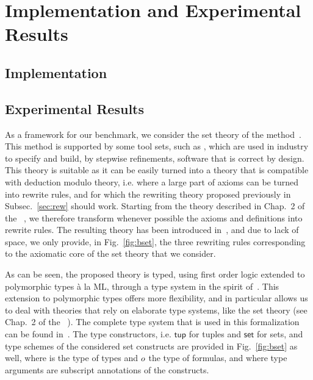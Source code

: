 
\section{Implementation and Experimental Results}
\label{sec:bench}

\subsection{Implementation}

\subsection{Experimental Results}

As a framework for our benchmark, we consider the set theory of the \bmth{}
method~\cite{B-Book}. This method is supported by some tool sets, such as
\atelierb{}, which are used in industry to specify and build, by stepwise
refinements, software that is correct by design. This theory is suitable as it
can be easily turned into a theory that is compatible with deduction modulo
theory, i.e. where a large part of axioms can be turned into rewrite rules, and
for which the rewriting theory proposed previously in Subsec.~\ref{sec:rew}
should work. Starting from the theory described in Chap.~2 of the
\bbook{}~\cite{B-Book}, we therefore transform whenever possible the axioms and
definitions into rewrite rules. The resulting theory has been introduced
in~\cite{BA15}, and due to lack of space, we only provide, in
Fig.~\ref{fig:bset}, the three rewriting rules corresponding to the axiomatic
core of the \bmth{} set theory that we consider.

As can be seen, the proposed theory is typed, using first order logic extended
to polymorphic types à la ML, through a type system in the spirit
of~\cite{BP13}. This extension to polymorphic types offers more flexibility, and
in particular allows us to deal with theories that rely on elaborate type
systems, like the \bmth{} set theory (see Chap.~2 of the
\bbook{}~\cite{B-Book}). The complete type system that is used in this
formalization can be found in~\cite{BA15}. The type constructors,
i.e. $\mathsf{tup}$ for tuples and $\mathsf{set}$ for sets, and type schemes of
the considered set constructs are provided in Fig.~\ref{fig:bset} as well, where
\type{} is the type of types and $o$ the type of formulas, and where type
arguments are subscript annotations of the constructs.

